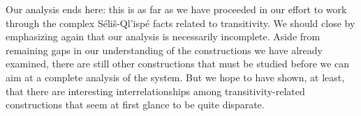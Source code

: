 \documentclass[output=paper,colorlinks,citecolor=brown]{langscibook}
\begin{document}
Our analysis ends here: this is as far as we have proceeded in our
effort to work through the complex S\'eli\v{s}-Ql'isp\'e facts related
to transitivity.  We should close by emphasizing again that our
analysis is necessarily incomplete.  Aside from remaining gaps in our
understanding of the constructions we have already examined, there are
still other constructions that must be studied before we can aim at a
complete analysis of the system.  But we hope to have shown, at least,
that there are interesting interrelationships among
transitivity-related constructions that seem at first glance to be
quite disparate.

\sloppy
\printbibliography[heading=subbibliography,notkeyword=this]
\end{document}
